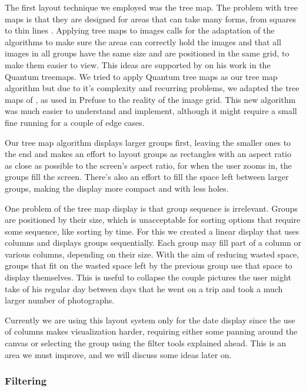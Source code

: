 The first layout technique we employed was the tree map. The problem with tree maps is that they are designed for areas that can take many forms, from squares to thin lines . Applying tree maps to images calls for the adaptation of the algorithms to make sure the areas can correctly hold the images and that all images in all groups have the same size and are positioned in the same grid, to make them easier to view. This ideas are supported by  on his work in the Quantum treemaps. We tried to apply Quantum tree maps as our tree map algorithm but due to it's complexity and recurring problems, we adapted the tree maps of , as used in Prefuse   to the reality of the image grid. This new algorithm was much easier to understand and implement, although  it might require a small fine running for a couple of edge cases.

Our tree map algorithm displays larger groups first, leaving the smaller ones to the end and makes an effort to layout groups as rectangles with an aspect ratio as close as possible to the screen's aspect ratio, for when the user zooms in, the groups fill the screen. There's also an effort to fill the space left between larger groups, making the display more compact and with less holes.

One problem of the tree map display is that group sequence is irrelevant. Groups are positioned by their size, which is unacceptable for sorting options that require some sequence, like sorting by time. For this we created a linear display that uses columns and displays groups sequentially. Each group may fill part of a column or various columns, depending on their size. With the aim of reducing wasted space, groups that fit on the wasted space left by the previous group use that space to display themselves. This is useful  to collapse the couple pictures the user might take of his regular day between days that he went on a trip and took a much larger number of photographs.

Currently we are using this layout system only for the date display since the use of columns makes visualization harder, requiring either some panning around the canvas or selecting the group using the filter tools explained ahead. This is an area we must improve, and we will discuss some ideas later on.


\subsubsection{Filtering} %

